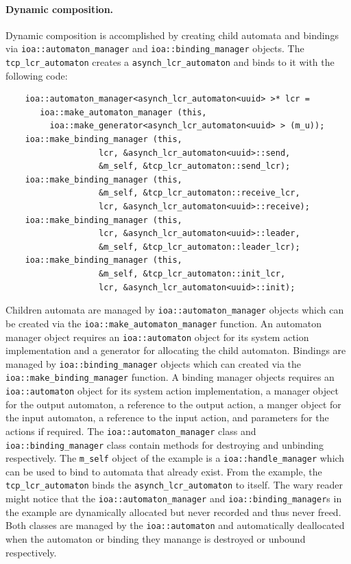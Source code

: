 \paragraph{Dynamic composition.}
Dynamic composition is accomplished by creating child automata and bindings via \verb+ioa::automaton_manager+ and \verb+ioa::binding_manager+ objects.
The \verb+tcp_lcr_automaton+ creates a \verb+asynch_lcr_automaton+ and binds to it with the following code:
\begin{lstlisting}
    ioa::automaton_manager<asynch_lcr_automaton<uuid> >* lcr =
       ioa::make_automaton_manager (this,
         ioa::make_generator<asynch_lcr_automaton<uuid> > (m_u));
    ioa::make_binding_manager (this,
			       lcr, &asynch_lcr_automaton<uuid>::send,
			       &m_self, &tcp_lcr_automaton::send_lcr);
    ioa::make_binding_manager (this,
			       &m_self, &tcp_lcr_automaton::receive_lcr,
			       lcr, &asynch_lcr_automaton<uuid>::receive);
    ioa::make_binding_manager (this,
			       lcr, &asynch_lcr_automaton<uuid>::leader,
			       &m_self, &tcp_lcr_automaton::leader_lcr);
    ioa::make_binding_manager (this,
			       &m_self, &tcp_lcr_automaton::init_lcr,
			       lcr, &asynch_lcr_automaton<uuid>::init);
\end{lstlisting}
Children automata are managed by \verb+ioa::automaton_manager+ objects which can be created via the \verb+ioa::make_automaton_manager+ function.
An automaton manager object requires an \verb+ioa::automaton+ object for its system action implementation and a generator for allocating the child automaton.
Bindings are managed by \verb+ioa::binding_manager+ objects which can created via the \verb+ioa::make_binding_manager+ function.
A binding manager objects requires an \verb+ioa::automaton+ object for its system action implementation, a manager object for the output automaton, a reference to the output action, a manger object for the input automaton, a reference to the input action, and parameters for the actions if required.
The \verb+ioa::automaton_manager+ class and \verb+ioa::binding_manager+ class contain methods for destroying and unbinding respectively.
The \verb+m_self+ object of the example is a \verb+ioa::handle_manager+ which can be used to bind to automata that already exist.
From the example, the \verb+tcp_lcr_automaton+ binds the \verb+asynch_lcr_automaton+ to itself.
The wary reader might notice that the \verb+ioa::automaton_manager+ and \verb+ioa::binding_manager+s in the example are dynamically allocated but never recorded and thus never freed.
Both classes are managed by the \verb+ioa::automaton+ and automatically deallocated when the automaton or binding they manange is destroyed or unbound respectively.

